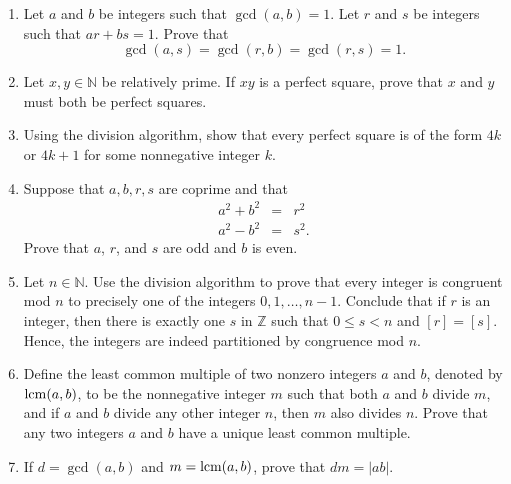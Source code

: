 {\begin{enumerate}
\begin{enumerate}
 \item
Prove that $f_n = [(1 + \sqrt{5}\, )^n - (1 - \sqrt{5}\, )^n]/ 2^n \sqrt{5}$.
 
 \item
Show that $\lim_{n \rightarrow \infty} f_n / f_{n + 1} = (\sqrt{5} - 1)/2$. 
 
 \item
Prove that $f_n$ and $f_{n + 1}$ are relatively prime.
 
\end{enumerate}

\item
Let $a$ and $b$ be integers such that $\gcd(a,b) = 1$.  Let $r$ and $s$ be integers such that $ar + bs =1$.  Prove that 
\[
\gcd(a,s) = \gcd(r,b) = \gcd(r,s) =  1.
\]

\item
Let $x, y \in {\mathbb N}$ be relatively prime.  If $xy$ is a perfect square, prove that $x$ and $y$ must both be perfect squares.

\item
Using the division algorithm, show that every perfect square is of the form $4k$ or $4k + 1$ for some nonnegative integer $k$.

\item
Suppose that $a, b, r, s$ are coprime and that
\begin{eqnarray*}
a^2 + b^2 &=& r^2 \\
a^2 - b^2 &=& s^2.
\end{eqnarray*}
Prove that $a$, $r$, and $s$ are odd and $b$ is even.
 
\item
Let $n \in {\mathbb N}$.  Use the division algorithm to prove that every integer is congruent mod $n$ to precisely one of the integers $0, 1, \ldots, n-1$.  Conclude that if $r$ is an integer, then there is exactly one $s$ in ${\mathbb Z}$ such that $0 \leq s < n$ and $[r] = [s]$.   Hence, the integers are indeed partitioned by congruence mod $n$. 

\item
Define the {\bfi least common multiple\/} of two nonzero integers $a$ and $b$, denoted by $\operatorname{lcm}(a,b)$\label{leastcm}, to be the nonnegative integer $m$ such that both $a$ and $b$ divide $m$, and if $a$ and $b$  divide any other integer $n$, then $m$ also divides $n$.  Prove that any two integers $a$ and $b$ have a unique least common multiple. 

\item
If $d= \gcd(a, b)$ and $m = \operatorname{lcm}(a, b)$, prove that $dm = |ab|$.


\end{enumerate}}
